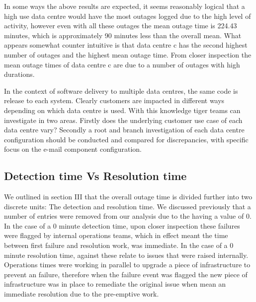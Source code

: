 \documentclass[conference]{IEEEtran}
\begin{document}
In some ways the above results are expected, it seems reasonably logical that a high use data centre would have the most outages logged due to the high level of activity, however even with all these outages the mean outage time is 224.43 minutes, which is approximately 90 minutes less than the overall mean. What appears somewhat counter intuitive is that data centre c has the second highest number of outages and the highest mean outage time. From closer inspection the mean outage times of data centre c are due to a number of outages with high durations. \par

In the context of software delivery to multiple data centres, the same code is release to each system. Clearly customers are impacted in different ways depending on which data centre is used. With this knowledge tiger teams can investigate in two areas. Firstly does the underlying customer use case of each data centre vary? Secondly a root and branch investigation of each data centre configuration should be conducted and compared for discrepancies, with specific focus on the e-mail component configuration. \par

\subsection{Detection time Vs Resolution time}

We outlined in section III that the overall outage time is divided further into two discrete units: The detection and resolution time. We discussed previously that a number of entries were removed from our analysis due to the having a value of 0. In the case of a 0 minute detection time, upon closer inspection these failures were flagged by internal operations teams, which in effect meant the time between first failure and resolution work, was immediate. In the case of a 0 minute resolution time, against these relate to issues that were raised internally. Operations times were working in parallel to upgrade a piece of infrastructure to prevent an failure, therefore when the failure event was flagged the new piece of infrastructure was in place to remediate the original issue when mean an immediate resolution due to the pre-emptive work. \par
\end{document}
